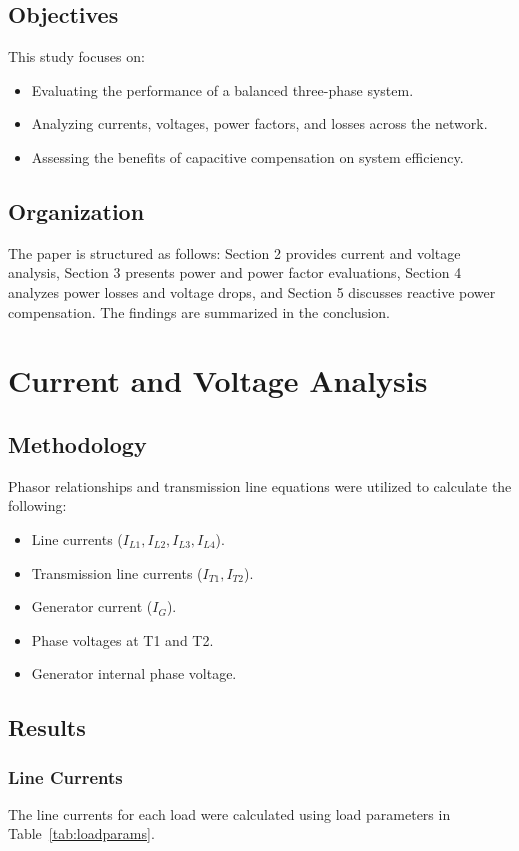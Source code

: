 \documentclass[conference]{IEEEtran}
\begin{document}
\subsection{Objectives}
This study focuses on:
\begin{itemize}
    \item Evaluating the performance of a balanced three-phase system.
    \item Analyzing currents, voltages, power factors, and losses across the network.
    \item Assessing the benefits of capacitive compensation on system efficiency.
\end{itemize}

\subsection{Organization}
The paper is structured as follows: Section 2 provides current and voltage analysis, Section 3 presents power and power factor evaluations, Section 4 analyzes power losses and voltage drops, and Section 5 discusses reactive power compensation. The findings are summarized in the conclusion.

\section{Current and Voltage Analysis}

\subsection{Methodology}
Phasor relationships and transmission line equations were utilized to calculate the following:
\begin{itemize}
    \item Line currents ($I_{L1}, I_{L2}, I_{L3}, I_{L4}$).
    \item Transmission line currents ($I_{T1}, I_{T2}$).
    \item Generator current ($I_{G}$).
    \item Phase voltages at T1 and T2.
    \item Generator internal phase voltage.
\end{itemize}


\subsection{Results}
\subsubsection{Line Currents}
The line currents for each load were calculated using load parameters in Table~\ref{tab:loadparams}.
\end{document}

